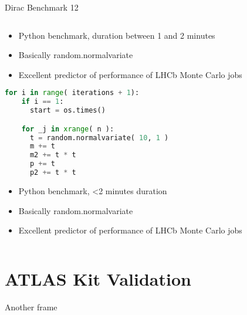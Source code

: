\documentclass{beamer}
\begin{document}
\begin{frame}[fragile]{Dirac Benchmark 12}
\begin{columns}[T]
    \begin{column}{0.50\textwidth}
        \begin{itemize}
            \small
            \item Python benchmark, duration between 1 and 2 minutes
            \item Basically random.normalvariate
            \item Excellent predictor of performance of  
                  LHCb Monte Carlo jobs
        \end{itemize}
        \begin{lstlisting}[language=Python, caption=Source code avilable on \href{https://github.com/DIRACGrid/DB12}{github}]
for i in range( iterations + 1):
    if i == 1:
      start = os.times()

    for _j in xrange( n ):
      t = random.normalvariate( 10, 1 )
      m += t
      m2 += t * t
      p += t
      p2 += t * t
        \end{lstlisting}
        \begin{itemize}
            \small
            \item Python benchmark, \textless2 minutes duration
            \item Basically random.normalvariate
            \item Excellent predictor of performance of  
                  LHCb Monte Carlo jobs
        \end{itemize}
    \end{column}
    \begin{column}{0.50\textwidth}
    \end{column}
\end{columns}
\end{frame}

\section{ATLAS Kit Validation}
\begin{frame}[fragile]{Another frame}
\end{frame}
\backcover
\end{document}
